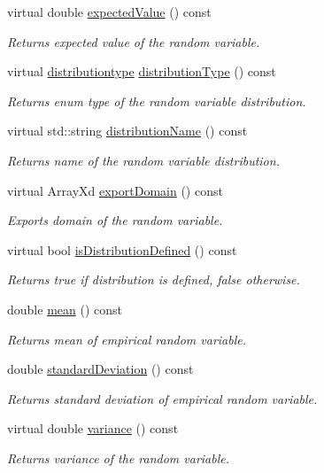 \begin{DoxyCompactItemize}
virtual double \hyperlink{class_c_empirical_c_r_v_ab650ea825752fda0fe5d77790bda9d98}{expected\-Value} () const 
\begin{DoxyCompactList}\small\item\em Returns expected value of the random variable. \end{DoxyCompactList}\item 
virtual \hyperlink{class_c_random_variable_a80d2a87c43847274138b51f7d713d7f1}{distributiontype} \hyperlink{class_c_empirical_c_r_v_a3a05ff5a7dbceae66c3ec868f90a0c51}{distribution\-Type} () const 
\begin{DoxyCompactList}\small\item\em Returns enum type of the random variable distribution. \end{DoxyCompactList}\item 
virtual std\-::string \hyperlink{class_c_empirical_c_r_v_aa40d56ae3bdfafcd1ac595a4180bf33b}{distribution\-Name} () const 
\begin{DoxyCompactList}\small\item\em Returns name of the random variable distribution. \end{DoxyCompactList}\item 
virtual Array\-Xd \hyperlink{class_c_empirical_c_r_v_ae79ea609e95ae1cef28f7f6ec6e2cd73}{export\-Domain} () const 
\begin{DoxyCompactList}\small\item\em Exports domain of the random variable. \end{DoxyCompactList}\item 
virtual bool \hyperlink{class_c_empirical_c_r_v_a5a7d81a23bd1284497287440fbd2b160}{is\-Distribution\-Defined} () const 
\begin{DoxyCompactList}\small\item\em Returns true if distribution is defined, false otherwise. \end{DoxyCompactList}\item 
double \hyperlink{class_c_empirical_c_r_v_ac09b259e473b04aa40aa86e05b2a549c}{mean} () const 
\begin{DoxyCompactList}\small\item\em Returns mean of empirical random variable. \end{DoxyCompactList}\item 
double \hyperlink{class_c_empirical_c_r_v_a93d29fa2419b335adb1f099a35709b41}{standard\-Deviation} () const 
\begin{DoxyCompactList}\small\item\em Returns standard deviation of empirical random variable. \end{DoxyCompactList}\item 
virtual double \hyperlink{class_c_empirical_c_r_v_a0654170ccecffe3963db0c59c3d90d97}{variance} () const 
\begin{DoxyCompactList}\small\item\em Returns variance of the random variable. \end{DoxyCompactList}\end{DoxyCompactItemize}
